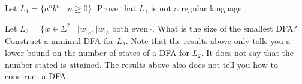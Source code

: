   \begin{tightlist}
  \item Let $L_1 = \{a^n b^n \mid n \geq 0\}$.
    Prove that $L_1$ is not a regular language.
  \item
    Let $L_2 = \{w \in \Sigma^* \mid |w|_a, |w|_b \text{ both even}\}$.
    What is the size of the smallest DFA?
    Construct a minimal DFA for $L_2$.
    Note that the results above only tells you a lower bound
    on the number of states of a DFA for $L_2$.
    It does not say that the number stated is attained.
    The results above also does not tell you how to construct a DFA.
  \end{tightlist}
